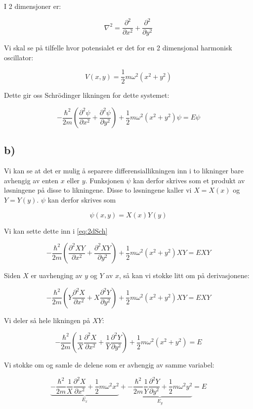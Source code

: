\documentclass[a4paper,norsk, 10pt]{article}
\numberwithin{equation}{section}
\begin{document}
I 2 dimensjoner er:

$$
\nabla^2 = \frac{\partial^2}{\partial x^2} + \frac{\partial^2}{\partial y^2}
$$

Vi skal se på tilfelle hvor potensialet er det for en 2 dimensjonal harmonisk oscillator:

$$
V(x,y) = \frac{1}{2}m\omega^2(x^2 + y^2)
$$

Dette gir oss Schrödinger likningen for dette systemet:

\begin{equation}
-\frac{\hbar^2}{2m}\left(\frac{\partial^2 \psi}{\partial x^2} + \frac{\partial^2 \psi}{\partial y^2}\right) + \frac{1}{2}m\omega^2(x^2 + y^2)\psi = E\psi
\label{eq:2dSch}
\end{equation}

\subsection*{b)}

Vi kan se at det er mulig å separere differensiallikningen inn i to likninger bare avhengig av enten $x$ eller $y$. Funksjonen $\psi$ kan derfor skrives som et produkt av løsningene på disse to likningene. Disse to løsningene kaller vi $X = X(x)$ og $Y = Y(y)$. $\psi$ kan derfor skrives som

$$
\psi(x,y) = X(x)Y(y)
$$

Vi kan sette dette inn i \eqref{eq:2dSch}

$$
-\frac{\hbar^2}{2m}\left(\frac{\partial^2 XY}{\partial x^2} + \frac{\partial^2 XY}{\partial y^2}\right) + \frac{1}{2}m\omega^2(x^2 + y^2)XY = EXY
$$


Siden $X$ er uavhenging av $y$ og $Y$ av $x$, så kan vi stokke litt om på derivasjonene:

$$
-\frac{\hbar^2}{2m}\left(Y\frac{\partial^2 X}{\partial x^2} + X\frac{\partial^2 Y}{\partial y^2}\right) + \frac{1}{2}m\omega^2(x^2 + y^2)XY = EXY
$$

Vi deler så hele likningen på $XY$:

$$
-\frac{\hbar^2}{2m}\left(\frac{1}{X}\frac{\partial^2 X}{\partial x^2} + \frac{1}{Y}\frac{\partial^2 Y}{\partial y^2}\right) + \frac{1}{2}m\omega^2(x^2 + y^2) = E
$$

Vi stokke om og samle de delene som er avhengig av samme variabel:

\begin{equation}
\underbrace{-\frac{\hbar^2}{2m}\frac{1}{X}\frac{\partial^2 X}{\partial x^2} + \frac{1}{2}m\omega^2x^2}_{E_x} + \underbrace{-\frac{\hbar^2}{2m}\frac{1}{Y}\frac{\partial^2 Y}{\partial y^2} + \frac{1}{2}m\omega^2y^2}_{E_y} = E
\label{eq:ExEy}
\end{equation}
\end{document}
